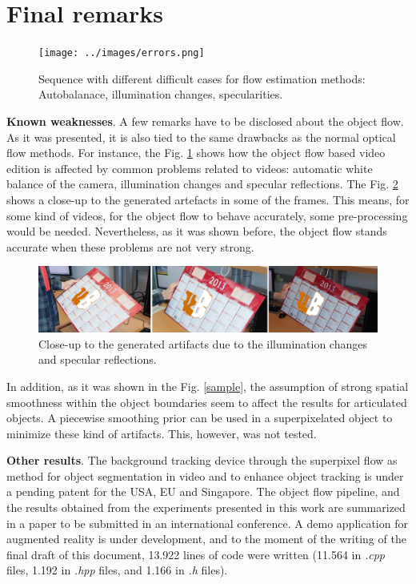 \section{Final remarks} \label{sec:remarks}

   \begin{figure}[thpb]
      \centering
      \texttt{[image: ../images/errors.png]}
      \caption{ Sequence with different difficult cases for flow estimation methods: Autobalanace, illumination changes, specularities. }
      \label{of_errors}
   \end{figure}

\textbf{Known weaknesses}. A few remarks have to be disclosed about the object flow. As it was presented, it is also tied to the same drawbacks as the normal optical flow methods. 
For instance, the Fig. \ref{of_errors} shows how the object flow based video edition is affected by common problems related to videos: 
automatic white balance of the camera, illumination changes and specular reflections. The Fig. \ref{zoom_errors} shows a close-up to the generated 
artefacts in some of the frames. This means, for some kind of videos, for the object flow to behave accurately, some pre-processing would be needed. 
Nevertheless, as it was shown before, the object flow stands accurate when these problems are not very strong.

   \begin{figure}[thpb]
      \centering
      \includegraphics[width=1.00\textwidth]{../images/zoomerrors.png}
      \caption{Close-up to the generated artifacts due to the illumination changes and specular reflections. }
      \label{zoom_errors}
   \end{figure}

In addition, as it was shown in the Fig. \ref{sample}, the assumption of strong spatial smoothness within the object boundaries seem to affect the results 
for articulated objects. A piecewise smoothing prior can be used in a superpixelated object to minimize these kind of artifacts. This, however, was not tested.

\textbf{Other results}. The background tracking device through the superpixel flow as method 
for object segmentation in video and to enhance object tracking is under a pending patent for the USA, EU and Singapore.
The object flow pipeline, and the results obtained from the experiments 
presented in this work are summarized in a paper to be submitted in an international conference. 
A demo application for augmented reality is under development, and to the moment of 
the writing of the final draft of this document, 13.922 lines of code 
were written (11.564 in {\it .cpp} files, 
1.192 in {\it .hpp} files, and 1.166 in {\it .h} files).

